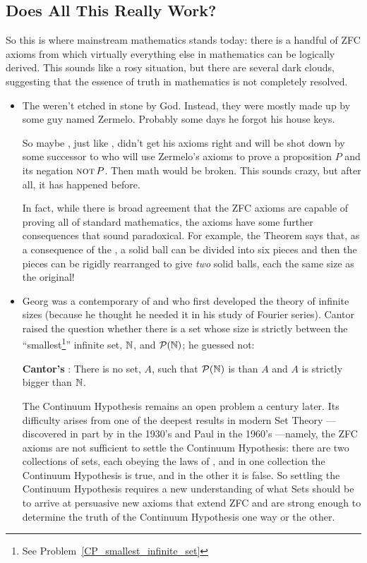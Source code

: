 \subsection{Does All This Really Work?}\label{setsreallywork}

So this is where mainstream mathematics stands today: there is a handful
of ZFC axioms from which virtually everything else in mathematics can be
logically derived.  This sounds like a rosy situation, but there are
several dark clouds, suggesting that the essence of truth in mathematics
is not completely resolved.

%
\begin{itemize}

\item The  weren't etched in stone by God.  Instead, they were
  mostly made up by some guy named Zermelo.  Probably some days he
  forgot his house keys.

  So maybe , just like , didn't get his axioms
  right and will be shot down by some successor to  who
  will use Zermelo's axioms to prove a proposition $P$ and its
  negation $\mathop{\mathrm{\textsc{not}}} P$.  Then math would be broken.  This sounds crazy,
  but after all, it has happened before.

  In fact, while there is broad agreement that the ZFC axioms are capable
  of proving all of standard mathematics, the axioms have some further
  consequences that sound paradoxical.  For example, the 
  Theorem says that, as a consequence of the , a solid ball
  can be divided into six pieces and then the pieces can be rigidly
  rearranged to give \emph{two} solid balls, each the same size as the
  original!

\item Georg  was a contemporary of  and
   who first developed the theory of infinite sizes (because
  he thought he needed it in his study of Fourier series).  Cantor raised
  the question whether there is a set whose size is strictly between the
  ``smallest\footnote{See Problem~\ref{CP_smallest_infinite_set}}''
  infinite set, $\mathbb{N}$, and $\mathcal{P}(\mathbb{N})$; he guessed not:

  \textbf{Cantor's }: There is no set, $A$,
  such that $\mathcal{P}(\mathbb{N})$ is  than $A$ and $A$
  is strictly bigger than $\mathbb{N}$.

  The Continuum Hypothesis remains an open problem a century later.  Its
  difficulty arises from one of the deepest results in modern Set Theory
  ---discovered in part by  in the 1930's and Paul
   in the 1960's ---namely, the ZFC axioms are not sufficient
  to settle the Continuum Hypothesis: there are two collections of sets,
  each obeying the laws of , and in one collection the Continuum
  Hypothesis is true, and in the other it is false.  So settling the
  Continuum Hypothesis requires a new understanding of what Sets should be
  to arrive at persuasive new axioms that extend ZFC and are strong enough
  to determine the truth of the Continuum Hypothesis one way or the other.


\end{itemize}
